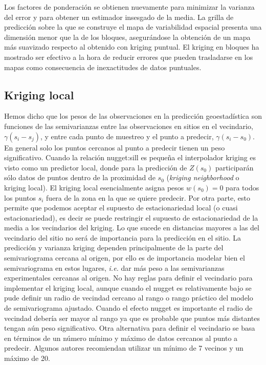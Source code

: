 \documentclass[11pt,b5paper,]{krantz}
\begin{document}
Los factores de ponderación se obtienen nuevamente para minimizar la
varianza del error y para obtener un estimador insesgado de la media. La
grilla de predicción sobre la que se construye el mapa de variabilidad
espacial presenta una dimensión menor que la de los bloques,
asegurándose la obtención de un mapa más suavizado respecto al obtenido
con kriging puntual. El kriging en bloques ha mostrado ser efectivo a la
hora de reducir errores que pueden trasladarse en los mapas como
consecuencia de inexactitudes de datos puntuales.

\subsection{Kriging local}\label{kriging-local}

Hemos dicho que los pesos de las observaciones en la predicción
geoestadística son funciones de las semivarianzas entre las
observaciones en sitios en el vecindario, \(\gamma(s_i-s_j)\), y entre
cada punto de muestreo y el punto a predecir, \(\gamma(s_i-s_0)\). En
general solo los puntos cercanos al punto a predecir tienen un peso
significativo. Cuando la relación nugget:sill es pequeña el interpolador
kriging es visto como un predictor local, donde para la predicción de
\(Z(s_0)\) participarán sólo datos de puntos dentro de la proximidad de
\(s_0\) (\emph{kriging neighborhood} o kriging local). El kriging local
esencialmente asigna pesos \(w(s_0)=0\) para todos los puntos \(s_i\)
fuera de la zona en la que se quiere predecir. Por otra parte, esto
permite que podemos aceptar el supuesto de estacionariedad local (o
cuasi estacionariedad), es decir se puede restringir el supuesto de
estacionariedad de la media a los vecindarios del kriging. Lo que sucede
en distancias mayores a las del vecindario del sitio no será de
importancia para la predicción en el sitio. La predicción y varianza
kriging dependen principalmente de la parte del semivariograma cercana
al origen, por ello es de importancia modelar bien el semivariograma en
estos lugares, \emph{i.e.} dar más peso a las semivarianzas
experimentales cercanas al origen. No hay reglas para definir el
vecindario para implementar el kriging local, aunque cuando el nugget es
relativamente bajo se pude definir un radio de vecindad cercano al rango
o rango práctico del modelo de semivariograma ajustado. Cuando el efecto
nugget es importante el radio de vecindad debería ser mayor al rango ya
que es probable que puntos más distantes tengan aún peso significativo.
Otra alternativa para definir el vecindario se basa en términos de un
número mínimo y máximo de datos cercanos al punto a predecir. Algunos
autores recomiendan utilizar un mínimo de 7 vecinos y un máximo de 20.
\end{document}
